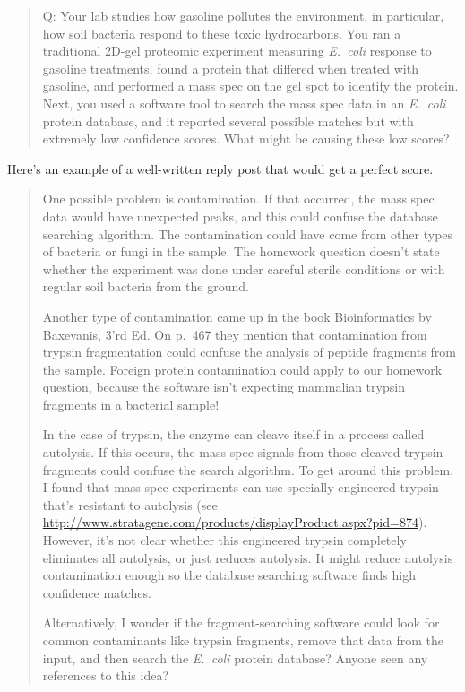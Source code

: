 \documentclass[12pt]{article}
\begin{document}
    \begin{quote}
      Q: Your lab studies how gasoline pollutes the environment, in
      particular, how soil bacteria respond to these toxic
      hydrocarbons.  You ran a traditional 2D-gel proteomic experiment
      measuring \textit{E.~coli} response to gasoline treatments,
      found a protein that differed when treated with gasoline, and
      performed a mass spec on the gel spot to identify the protein.
      Next, you used a software tool to search the mass spec data in
      an \textit{E.~coli} protein database, and it reported several
      possible matches but with extremely low confidence scores.  What
      might be causing these low scores?
    \end{quote}
    Here's an example of a well-written reply post that would get a
    perfect score.  \begin{quote} \setlength{\parskip}{1em}
      \setlength{\parindent}{0cm} One possible problem is
      contamination.  If that occurred, the mass spec data would
      have unexpected peaks, and this could confuse the database
      searching algorithm.  The contamination could have come from
      other types of bacteria or fungi in the sample.  The homework
      question doesn't state whether the experiment was done under
      careful sterile conditions or with regular soil bacteria from
      the ground.

      Another type of contamination came up in the book Bioinformatics
      by Baxevanis, 3'rd Ed.  On p.~467 they mention that
      contamination from trypsin fragmentation could confuse the
      analysis of peptide fragments from the sample.  Foreign protein
      contamination could apply to our homework question, because the
      software isn't expecting mammalian trypsin fragments in a
      bacterial sample!

      In the case of trypsin, the enzyme can cleave itself in a
      process called autolysis.  If this occurs, the mass spec signals from
      those cleaved trypsin fragments could confuse the search algorithm.
      To get around this problem, I found that mass spec experiments
      can use specially-engineered trypsin that's resistant to
      autolysis (see
      \url{http://www.stratagene.com/products/displayProduct.aspx?pid=874}).
      However, it's not clear whether this engineered trypsin completely eliminates all autolysis, or
      just reduces autolysis.  It might reduce autolysis contamination enough so
      the database searching software finds high confidence matches.

      Alternatively, I wonder if the fragment-searching software could
      look for common contaminants like trypsin fragments, remove that
      data from the input, and then search the \textit{E.~coli}
      protein database?  Anyone seen any references to this idea?
    \end{quote}
\end{document}
